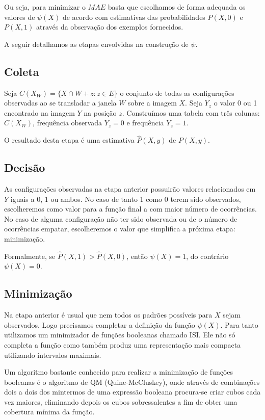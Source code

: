\documentclass[a4paper,11pt]{article}
\begin{document}
Ou seja, para minimizar o $MAE$ basta que escolhamos de forma adequada os valores de $\psi(X)$ de acordo com estimativas das probabilidades $P(X,0)$ e $P(X, 1)$ através da observação dos exemplos fornecidos.

A seguir detalhamos as etapas envolvidas na construção de $\psi$.

\subsection{Coleta}

Seja $C(X_W) = \{X \cap W + z \colon z \in E \}$ o conjunto de todas as configurações observadas ao se transladar a janela $W$ sobre a imagem $X$. Seja $Y_z$ o valor 0 ou 1 encontrado na imagem $Y$ na posição $z$. Construímos uma tabela com três colunas: $C(X_W)$, frequência observada $Y_z = 0$ e frequência $Y_z = 1$.

O resultado desta etapa é uma estimativa $\hat{P}(X, y)$ de $P(X, y)$.

\subsection{Decisão}

As configurações observadas na etapa anterior possuirão valores relacionados em $Y$ iguais a 0, 1 ou ambos. No caso de tanto 1 como 0 terem sido observados, escolheremos como valor para a função final a com maior número de ocorrências. No caso de alguma configuração não ter sido observada ou de o número de ocorrências empatar, escolheremos o valor que simplifica a próxima etapa: minimização.

Formalmente, se $\hat{P}(X, 1) > \hat{P}(X, 0)$, então $\psi(X) = 1$, do contrário $\psi(X) = 0$.

\subsection{Minimização}

Na etapa anterior é usual que nem todos os padrões possíveis para $X$ sejam observados. Logo precisamos completar a definição da função $\psi(X)$. Para tanto utilizamos um minimizador de funções booleanas chamado ISI. Ele não só completa a função como também produz uma representação mais compacta utilizando intervalos maximais.

Um algoritmo bastante conhecido para realizar a minimização de funções booleanas é o algoritmo de QM (Quine-McCluskey), onde através de combinações dois a dois dos mintermos de uma expressão booleana procura-se criar cubos cada vez maiores, eliminando depois os cubos sobressalentes a fim de obter uma cobertura mínima da função.
\end{document}
